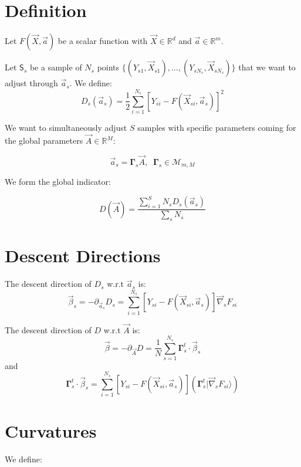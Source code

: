\documentclass[aps,12pt]{revtex4}
\begin{document}
\section{Definition}
Let $F(\vec{X},\vec{a})$ be a scalar function with $\vec{X} \in \mathbb{R}^d$ and $\vec{a}\in\mathbb{R}^m$.

Let $\mathsf{S}_s$ be a sample of $N_s$ points $\lbrace(Y_{s1},\vec{X}_{s1}),\ldots,(Y_{sN_s},\vec{X}_{sN_s})\rbrace$
that we want to adjust through $\vec{a}_s$.
We define:
\begin{equation}
	D_s(\vec{a}_s) = \dfrac{1}{2}\sum_{i=1}^{N_s} \left[ Y_{si} - F(\vec{X}_{si},\vec{a}_s)\right] ^2
\end{equation}

We want to simultaneously adjust $S$ samples with specific parameters coming for the global parameters $\vec{A}\in\mathbb{R}^M$:
	
\begin{equation}
	\vec{a}_s = \bm{\Gamma}_s \vec{A},\;\; \bm{\Gamma}_s \in \mathcal{M}_{m,M}
\end{equation}

We form the global indicator:

\begin{equation}
	D(\vec{A}) = \dfrac{\sum_{i=1}^{S} N_s D_s(\vec{a}_s)}{\sum_s N_s }
\end{equation}

\section{Descent Directions}
The descent direction of $D_s$ w.r.t $\vec{a}_s$ is:
\begin{equation}
	\vec{\beta}_s = -\partial_{\vec{a}_s} D_s 
	= \sum_{i=1}^{N_s} \left[Y_{si} - F(\vec{X}_{si},\vec{a}_s)\right] \vec{\nabla}_s F_{si} 
\end{equation}

The descent direction of $D$ w.r.t $\vec{A}$ is:
\begin{equation}
	\vec{\beta} = -\partial_{\vec{A}} D = \dfrac{1}{N} \sum_{s=1}^{N_s} \bm{\Gamma}_s^t \cdot \vec{\beta}_s
\end{equation}
and
\begin{equation}
	\bm{\Gamma}_s^t \cdot \vec{\beta}_s =  \sum_{i=1}^{N_s} \left[Y_{si} - F(\vec{X}_{si},\vec{a}_s)\right]
	\left(  \bm{\Gamma}_s^t \vert \vec{\nabla}_s F_{si} \rangle\right)
\end{equation}

\section{Curvatures}
We define:
\end{document}
